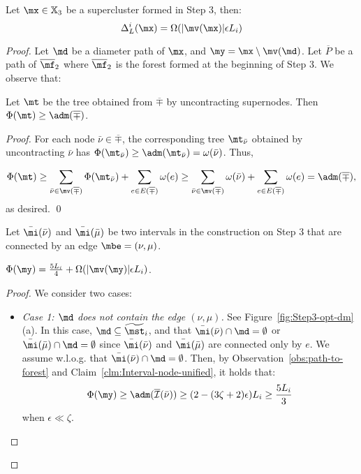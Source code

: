 \begin{lemma}\label{lm:Step3ClusterOracle}
	Let $\mx \in \mathbb{X}_3 $ be a supercluster formed in  Step 3, then:
	\begin{equation*}
	\Delta^i_{L}(\mx) = \Omega(|\mv(\mx)|\epsilon L_i)  
	\end{equation*}
\end{lemma}
\begin{proof} Let $\md$ be a diameter path of $\mx$, and $\my = \mx \setminus \mv(\md)$.	Let $\overline{P}$ be a path of $\overline{\mf}_2$ where $\overline{\mf}_2$ is the forest formed at the beginning of Step 3. We observe that:
\begin{observation}\label{obs:path-to-forest} Let $\mt$ be the tree obtained from $\overline{\mp}$ by uncontracting supernodes. Then $\Phi(\mt)\geq \adm(\overline{\mp})$.
\end{observation}	
\begin{proof}
	For each node $\bar{\nu}\in \overline{\mp}$, the corresponding tree $\mt_{\bar{\nu}}$ obtained by uncontracting $\bar{\nu}$ has $\Phi(\mt_{\bar{\nu}})\geq \adm(\mt_{\bar{\nu}}) = \omega(\bar{\nu})$. Thus, 
	
	\begin{equation*}
	\begin{split}
		\Phi(\mt) \geq \sum_{\bar{\nu}\in \mv(\overline{\mp})}\Phi(\mt_{\bar{\nu}}) + \sum_{e\in E(\overline{\mp})} \omega(e)
		 \geq   \sum_{\bar{\nu}\in \mv(\overline{\mp})}\omega(\bar\nu) + \sum_{e\in E(\overline{\mp})} \omega(e) = \adm(\overline{\mp}),
	\end{split}
	\end{equation*}
as desired. \qed
\end{proof}
	
	 Let $\bar{\mi}(\bar\nu)$ and $\bar\mi(\bar\mu)$ be two intervals  in the construction on Step 3 that are connected by an edge $\mbe = (\nu,\mu)$.
	 
	
	\begin{claim}\label{clm:PotentialY-boundOracle} $\Phi(\my)=  \frac{5L_{i} }{4}+ \Omega(|\mv(\my)|\epsilon L_i)$.
	\end{claim}
	\begin{proof} We consider two cases:
		\begin{itemize}
			\item \emph{Case 1: $\md$ does not contain the edge $(\nu,\mu)$.} See Figure~\ref{fig:Step3-opt-dm}(a). In this case, $\md \subseteq  \widetilde{\mst}_i$, and  that $\bar\mi(\bar\nu)\cap\md =\emptyset$ or $\bar\mi(\bar\mu)\cap \md = \emptyset$ since $\bar\mi(\bar\nu)$ and $\bar\mi(\bar\mu)$ are connected only by $e$. We assume w.l.o.g. that  $\bar\mi(\bar\nu)\cap\md =\emptyset$.  Then, by Observation~\ref{obs:path-to-forest} and Claim~\ref{clm:Interval-node-unified}, it holds that:
			\begin{equation*}
			\Phi(\my)\geq \adm(\overline{\mathcal{I}}(\bar\nu)) \geq (2-(3\zeta+2)\epsilon) L_i\geq \frac{5L_i}{3}
			\end{equation*}
		    when $\epsilon \ll \zeta$.
		    

\end{itemize}
\end{proof}
\end{proof}
